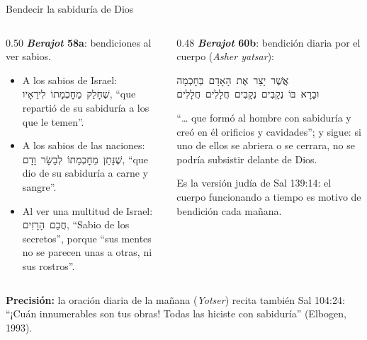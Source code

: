 \documentclass[hyperref={bookmarks=false},aspectratio=169]{beamer}
\newcommand{\heb}[1]{\mbox{\foreignlanguage{hebrew}{#1}}}
\newcommand{\precision}[1]{{\footnotesize\color{gris}\textbf{Precisión:} #1}}
\begin{document}
\begin{frame}{Bendecir la sabiduría de Dios}
\begin{columns}[t,onlytextwidth]
\begin{column}{0.50\textwidth}\small
\RaggedRight\textbf{\emph{Berajot} 58a}: bendiciones al ver sabios.
\begin{itemize}\RaggedRight
\item A los sabios de Israel: \heb{שֶׁחָלַק מֵחׇכְמָתוֹ לִירֵאָיו}, ``que repartió de su sabiduría a los que le temen''.
\item A los sabios de las naciones: \heb{שֶׁנָּתַן מֵחׇכְמָתוֹ לְבָשָׂר וָדָם}, ``que dio de su sabiduría a carne y sangre''.
\item Al ver una multitud de Israel: \heb{חֲכַם הָרָזִים}, ``Sabio de los secretos'', porque ``sus mentes no se parecen unas a otras, ni sus rostros''.
\end{itemize}
\end{column}
\begin{column}{0.48\textwidth}\small
\textbf{\emph{Berajot} 60b}: bendición diaria por el cuerpo (\emph{Asher yatsar}):
\begin{center}\heb{אֲשֶׁר יָצַר אֶת הָאָדָם בְּחׇכְמָה}\\ \heb{וּבָרָא בּוֹ נְקָבִים נְקָבִים חֲלָלִים חֲלָלִים}\end{center}
``\ldots{} que formó al hombre con sabiduría y creó en él orificios y cavidades''; y sigue: si uno de ellos se abriera o se cerrara, no se podría subsistir delante de Dios.\par\smallskip
\scriptsize Es la versión judía de Sal 139:14: el cuerpo funcionando a tiempo es motivo de bendición cada mañana.
\end{column}
\end{columns}
\precision{la oración diaria de la mañana (\emph{Yotser}) recita también Sal 104:24: ``¡Cuán innumerables son tus obras! Todas las hiciste con sabiduría'' (Elbogen, 1993).}
\end{frame}
\end{document}

